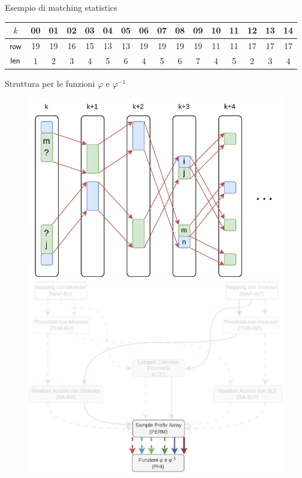 \documentclass[]{beamer}
\def\len{\mbox{\rm {\sf len}}}
\def\row{\mbox{\rm {\sf row}}}
\begin{document}
\begin{frame}{Esempio di matching statistics}
\begin{table}[H]
\begin{tabular}{c|ccccccccccccccc}
      $k$ & 00 & 01 & 02 & 03 & 04 &  {\color{nordcyan}05} & 06 & 07 & 08
      &  {\color{nordred}09} & 10 &  {\color{nordgreen}11} & 12 & 13
      &  {\color{nordpurple}14} \\
      \hline
      $\row$ & 19 & 19 & 16 & 15 & 13 &  {\color{nordcyan}13} & 19 & 19 & 19
      &  {\color{nordred}19} & 11 &  {\color{nordgreen}11} & 17 & 17
      &  {\color{nordpurple}17} \\
      $\len$ & 1 & 2 & 3 & 4 & 5 & {\color{nordcyan}6} & 4 & 5 & 6
      & {\color{nordred}7} & 4 & {\color{nordgreen}5} & 2 & 3
      & {\color{nordpurple}4}\\
    \end{tabular}
  \end{table}
\end{frame}
\begin{frame}{Struttura per le funzioni $\varphi$ e $\varphi^{-1}$}
  \begin{figure}[H]
    \centering
    \includegraphics[scale = 0.65, valign=t]{img/phi.pdf}
    \includegraphics[scale = 0.28, valign=t]{img/mini_phi3.pdf}

\end{figure}
\end{frame}
\end{document}
